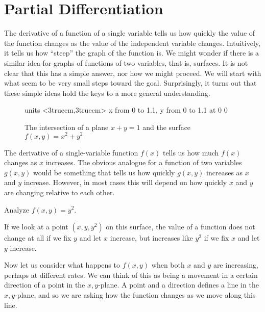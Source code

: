 \section{Partial Differentiation}\label{sec:PartialDifferentiation}

The derivative of a function of a single variable tells us how quickly
the value of the function changes as the value of the independent variable
changes. Intuitively, it tells us how ``steep'' the graph of the function is.
We might wonder if there is a similar idea for graphs of functions
of two variables, that is, surfaces. It is
not clear that this has a simple answer, nor how we might proceed. We
will start with what seem to be very small steps toward the goal.
Surprisingly, it turns out that these simple ideas hold the keys to a
more general understanding.

\begin{figure}[H]
\centerline{
\vbox{\beginpicture
\normalgraphs
\setcoordinatesystem units <3truecm,3truecm>
\setplotarea x from 0 to 1.1, y from 0 to 1.1
 at 0 0
\endpicture}}
\caption{The intersection of a plane $x+y=1$ and the surface $f(x,y)=x^2+y^2$}
\label{fig:parabolic bowl cross-section}
\end{figure}

The derivative of a single-variable function $f(x)$ tells us how much $f(x)$
changes as $x$ increases. The obvious analogue for a function of two
variables $g(x,y)$ would be something that tells us how quickly $g(x,y)$
increases as $x$ and $y$ increase. However, in most cases this will depend on
how quickly $x$ and $y$ are changing relative to each other.

\begin{example}{}{}
Analyze $f(x,y)=y^2$.
\end{example}
\begin{solution}
If we look at a point $(x,y,y^2)$ on this surface, the value of a function
does not change at all if we fix $y$ and let $x$ increase, but increases like $y^2$
if we fix $x$ and let $y$ increase.
\end{solution}

Now let us consider what happens to $f(x,y)$ when both $x$ and $y$ are
increasing, perhaps at different rates. We can think of this as being a
movement in a certain direction of a point in the $x,y$-plane. A point and a
direction defines a line in the $x,y$-plane, and so we are asking how the function
changes as we move along this line.

